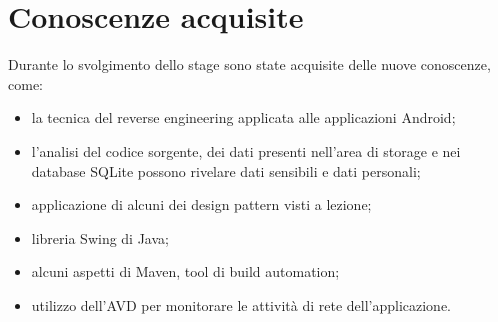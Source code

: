 

\section{Conoscenze acquisite}\label{sec:conoscenze-acquisite}
Durante lo svolgimento dello stage sono state acquisite delle nuove conoscenze, come:
\begin{itemize}\itemsep0em
\item la tecnica del reverse engineering applicata alle applicazioni Android;
\item l'analisi del codice sorgente, dei dati presenti nell'area di storage e nei database SQLite possono rivelare dati sensibili e dati personali;
\item applicazione di alcuni dei design pattern visti a lezione;
\item libreria Swing di Java;
\item alcuni aspetti di Maven, tool di build automation;
\item utilizzo dell'AVD per monitorare le attività di rete dell'applicazione.
\end{itemize}